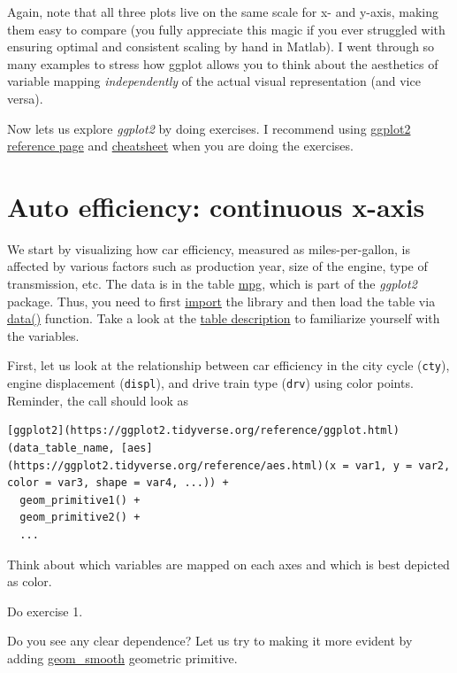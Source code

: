 \documentclass[
]{book}
\begin{document}
Again, note that all three plots live on the same scale for x- and y-axis, making them easy to compare (you fully appreciate this magic if you ever struggled with ensuring optimal and consistent scaling by hand in Matlab). I went through so many examples to stress how ggplot allows you to think about the aesthetics of variable mapping \emph{independently} of the actual visual representation (and vice versa).

Now lets us explore \emph{ggplot2} by doing exercises. I recommend using \href{https://ggplot2.tidyverse.org/}{ggplot2 reference page} and \href{https://github.com/rstudio/cheatsheets/raw/master/data-visualization-2.1.pdf}{cheatsheet} when you are doing the exercises.

\hypertarget{auto-efficiency-continuous-x-axis}{%
\section{Auto efficiency: continuous x-axis}\label{auto-efficiency-continuous-x-axis}}

We start by visualizing how car efficiency, measured as miles-per-gallon, is affected by various factors such as production year, size of the engine, type of transmission, etc. The data is in the table \href{https://ggplot2.tidyverse.org/reference/mpg.html}{mpg}, which is part of the \emph{ggplot2} package. Thus, you need to first \protect\hyperlink{library}{import} the library and then load the table via \protect\hyperlink{data}{data()} function. Take a look at the \href{https://ggplot2.tidyverse.org/reference/mpg.html}{table description} to familiarize yourself with the variables.

First, let us look at the relationship between car efficiency in the city cycle (\texttt{cty}), engine displacement (\texttt{displ}), and drive train type (\texttt{drv}) using color points. Reminder, the call should look as

\begin{verbatim}
[ggplot2](https://ggplot2.tidyverse.org/reference/ggplot.html)(data_table_name, [aes](https://ggplot2.tidyverse.org/reference/aes.html)(x = var1, y = var2, color = var3, shape = var4, ...)) + 
  geom_primitive1() + 
  geom_primitive2() +
  ...
\end{verbatim}

Think about which variables are mapped on each axes and which is best depicted as color.

Do exercise 1.

Do you see any clear dependence? Let us try to making it more evident by adding \href{https://ggplot2.tidyverse.org/reference/geom_smooth.html}{geom\_smooth} geometric primitive.
\end{document}
